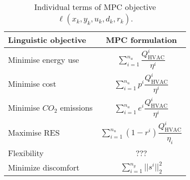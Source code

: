 \documentclass[10pt]{extarticle}
\begin{document}
\renewcommand{\arraystretch}{2.5}
\begin{table}[h]
	\centering
	\caption{Individual terms of MPC objective $\ell(x_k, y_k, u_k, d_k, r_k)$.}
	\label{tab:mpc_form:objectives}
	\begin{tabular}{l|c}
		\toprule
		\textbf{Linguistic objective}  & \textbf{MPC formulation} \\
		\midrule
		Minimise energy use &   $  \sum_{i=1}^{n_u} \dfrac{Q^{i}_{\text{HVAC}}}{\eta^i}$ \\
		Minimise cost & $  \sum_{i=1}^{n_u} p^i \dfrac{Q^{i}_{\text{HVAC}}}{\eta^i}$  \\
		Minimise $CO_2$ emissions & $ \sum_{i=1}^{n_u}  e^i \dfrac{Q^{i}_{\text{HVAC}}}{\eta^i}$  \\
		Maximise RES &  $ \sum_{i=1}^{n_u} (1-r^i) \dfrac{Q^{i}_{\text{HVAC}}}{\eta_i}$  \\
		Flexibility & ???  \\
		Minimize discomfort &  $ \sum_{i=1}^{n_y} ||s^i||^2_2$ \\
		\bottomrule 
	\end{tabular}
\end{table}
\end{document}
